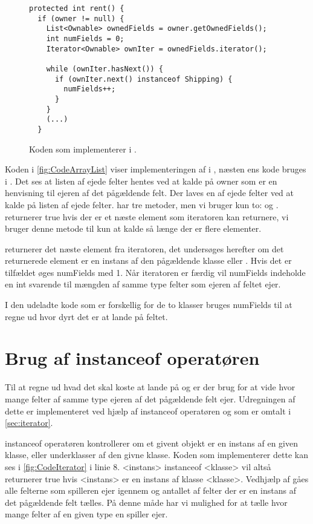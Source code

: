 \begin{figure}
\caption{Koden som implementerer  i .}
\label{fig:CodeIterator}
\centering
\begin{lstlisting}
protected int rent() {
  if (owner != null) {
    List<Ownable> ownedFields = owner.getOwnedFields();
    int numFields = 0;
    Iterator<Ownable> ownIter = ownedFields.iterator();

    while (ownIter.hasNext()) {
      if (ownIter.next() instanceof Shipping) {
        numFields++;
      }
    }
    (...)
  }
\end{lstlisting}
\end{figure}

Koden i \vref{fig:CodeArrayList} viser implementeringen af  i , næsten ens kode bruges i . Det ses at listen af ejede felter hentes ved at kalde  på owner som er en henvisning til ejeren af det pågældende felt. Der laves en  af ejede felter ved at kalde  på listen af ejede felter.  har tre metoder, men vi bruger kun to:  og .  returnerer true hvis der er et næste element som iteratoren kan returnere, vi bruger denne metode til kun at kalde  så længe der er flere elementer.\cite{javaUtilIterator}

 returnerer det næste element fra iteratoren, det undersøges herefter om det returnerede element er en instans af den pågældende klasse  eller . Hvis det er tilfældet øges numFields med 1. Når iteratoren er færdig vil numFields indeholde en int svarende til mængden af samme type felter som ejeren af feltet ejer.

I den udeladte kode som er forskellig for de to klasser bruges numFields til at regne ud hvor dyrt det er at lande på feltet.

\section{Brug af instanceof operatøren}\label{sec:instanceof}
Til at regne ud hvad det skal koste at lande på  og  er der brug for at vide hvor mange felter af samme type ejeren af det pågældende felt ejer. Udregningen af dette er implementeret ved hjælp af instanceof operatøren og  som er omtalt i \vref{sec:iterator}.

instanceof operatøren kontrollerer om et givent objekt er en instans af en given klasse, eller underklasser af den givne klasse. Koden som implementerer dette kan ses i \vref{fig:CodeIterator} i linie 8. <instans> instanceof <klasse> vil altså returnerer true hvis <instans> er en instans af klasse <klasse>. Vedhjælp af  gåes alle felterne som spilleren ejer igennem og antallet af felter der er en instans af det pågældende felt tælles. På denne måde har vi mulighed for at tælle hvor mange felter af en given type en spiller ejer.\cite{javaOperators}
